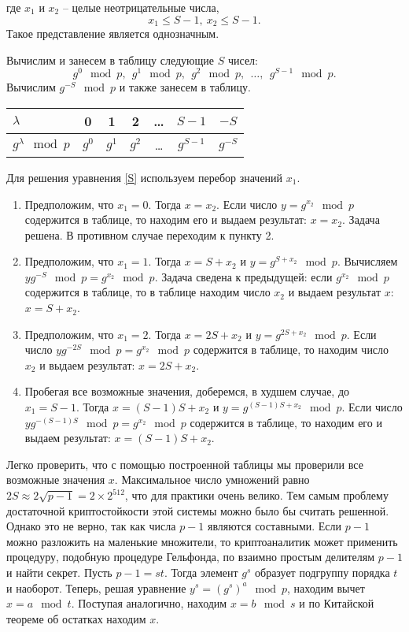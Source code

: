 где $x_{1}$ и $x_{2}$ -- целые неотрицательные числа,
    \[ x_{1} \le S-1, ~ x_{2} \le S-1. \]
Такое представление является однозначным.

Вычислим и занесем в таблицу следующие $S$  чисел:
    \[ g^{0} \mod p, ~~ g^{1} \mod p, ~~ g^{2} \mod p, ~~ \dots, ~~ g^{S-1} \mod p. \]
Вычислим $g^{-S} \mod p$ и также занесем в таблицу.

\begin{center} \begin{tabular}{|l|c|c|c|c|c|c|}
    \hline
    $\lambda $ & 0 & 1 & 2 & \dots & $S-1$ & $-S$ \\
    \hline
    $g^{\lambda} \mod p$ & $g^{0}$ & $g^{1}$ & $g^{2}$ & \dots & $g^{S-1}$ & $g^{-S}$ \\
    \hline
\end{tabular} \end{center}

Для решения уравнения \ref{S} используем перебор значений $x_{1}$.
\begin{enumerate}
    \item  Предположим, что $x_{1} = 0$. Тогда $x = x_{2}$.  Если число $y = g^{x_{2}} \mod p$ содержится в таблице, то  находим его и выдаем результат: $x=x_{2} $. Задача решена. В противном случае переходим к пункту 2.
    \item  Предположим, что $x_{1} =1$. Тогда $x=S+x_{2} $ и $y=g^{S+x_{2}} \mod p$. Вычисляем $yg^{-S} \mod p=g^{x_{2}} \mod p$. Задача сведена к предыдущей: если $g^{x_{2} } \mod p$ содержится в таблице, то в таблице находим число $x_{2} $ и выдаем результат $x$: $x=S+x_{2} $.
    \item  Предположим, что $x_{1} =2$. Тогда $x=2S+x_{2} $ и $y=g^{2S+x_{2} } \mod p$. Если число $yg^{-2S} \mod p=g^{x_{2} } \mod p$ содержится в таблице, то находим число $x_{2}$ и выдаем результат: $x = 2S + x_{2}$.
     \item  Пробегая все возможные значения, доберемся, в худшем случае, до $x_{1} =S-1$. Тогда $x=(S-1)S+x_{2} $ и $y = g^{(S-1)S+x_{2} } \mod p$. Если число $yg^{-(S-1)S} \mod p=g^{x_{2}} \mod p$ содержится в таблице, то  находим его и выдаем результат: $x=(S-1)S+x_{2}$.
\end{enumerate}

Легко проверить, что с помощью построенной таблицы мы проверили все возможные значения $x$. Максимальное число умножений равно $2S \approx 2\sqrt{p-1} =2\times 2^{512} $, что для практики очень велико.  Тем самым проблему достаточной криптостойкости этой системы можно было бы считать решенной. Однако это не верно, так как числа $p-1$ являются составными. Если  $p-1$ можно разложить на маленькие множители, то криптоаналитик может применить процедуру, подобную процедуре Гельфонда, по взаимно простым делителям  $p-1$  и найти секрет. Пусть  $p-1=st$. Тогда элемент $g^s$ образует подгруппу порядка $t$ и наоборот. Теперь, решая уравнение $y^s=(g^s)^a\mod p$, находим вычет $x=a\mod t$. Поступая аналогично, находим $x=b\mod s$ и по Китайской теореме об остатках находим $x$.

